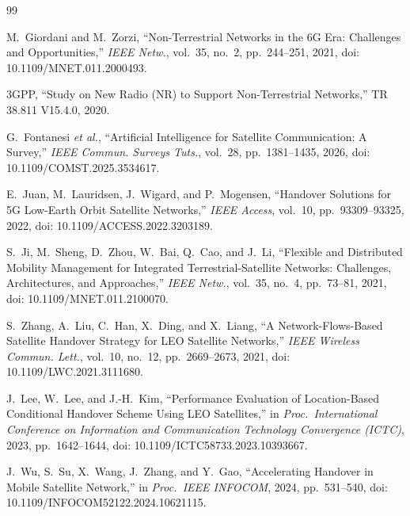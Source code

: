 \documentclass[journal]{IEEEtran}
\begin{document}
\begin{thebibliography}{99}

M.~Giordani and M.~Zorzi, ``Non-Terrestrial Networks in the 6G Era: Challenges and Opportunities,'' \emph{IEEE Netw.}, vol.~35, no.~2, pp.~244--251, 2021, doi: 10.1109/MNET.011.2000493.

3GPP, ``Study on New Radio (NR) to Support Non-Terrestrial Networks,'' TR 38.811 V15.4.0, 2020.

G.~Fontanesi \emph{et al.}, ``Artificial Intelligence for Satellite Communication: A Survey,'' \emph{IEEE Commun. Surveys Tuts.}, vol.~28, pp.~1381--1435, 2026, doi: 10.1109/COMST.2025.3534617.

E.~Juan, M.~Lauridsen, J.~Wigard, and P.~Mogensen, ``Handover Solutions for 5G Low-Earth Orbit Satellite Networks,'' \emph{IEEE Access}, vol.~10, pp.~93309--93325, 2022, doi: 10.1109/ACCESS.2022.3203189.

S.~Ji, M.~Sheng, D.~Zhou, W.~Bai, Q.~Cao, and J.~Li, ``Flexible and Distributed Mobility Management for Integrated Terrestrial-Satellite Networks: Challenges, Architectures, and Approaches,'' \emph{IEEE Netw.}, vol.~35, no.~4, pp.~73--81, 2021, doi: 10.1109/MNET.011.2100070.

S.~Zhang, A.~Liu, C.~Han, X.~Ding, and X.~Liang, ``A Network-Flows-Based Satellite Handover Strategy for LEO Satellite Networks,'' \emph{IEEE Wireless Commun. Lett.}, vol.~10, no.~12, pp.~2669--2673, 2021, doi: 10.1109/LWC.2021.3111680.

J.~Lee, W.~Lee, and J.-H.~Kim, ``Performance Evaluation of Location-Based Conditional Handover Scheme Using LEO Satellites,'' in \emph{Proc.\ International Conference on Information and Communication Technology Convergence (ICTC)}, 2023, pp.~1642--1644, doi: 10.1109/ICTC58733.2023.10393667.

J.~Wu, S.~Su, X.~Wang, J.~Zhang, and Y.~Gao, ``Accelerating Handover in Mobile Satellite Network,'' in \emph{Proc.\ IEEE INFOCOM}, 2024, pp.~531--540, doi: 10.1109/INFOCOM52122.2024.10621115.


\end{thebibliography}
\end{document}
